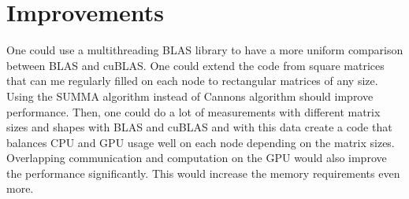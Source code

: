\section{Improvements}
One could use a multithreading BLAS library to have a more uniform comparison between BLAS and cuBLAS. One could extend the code from square matrices that can me regularly filled on each node to rectangular matrices of any size. Using the SUMMA algorithm instead of Cannons algorithm should improve performance. Then, one could do a lot of measurements with different matrix sizes and shapes with BLAS and cuBLAS and with this data create a code that balances CPU and GPU usage well on each node depending on the matrix sizes. Overlapping communication and computation on the GPU would also improve the performance significantly. This would increase the memory requirements even more.
